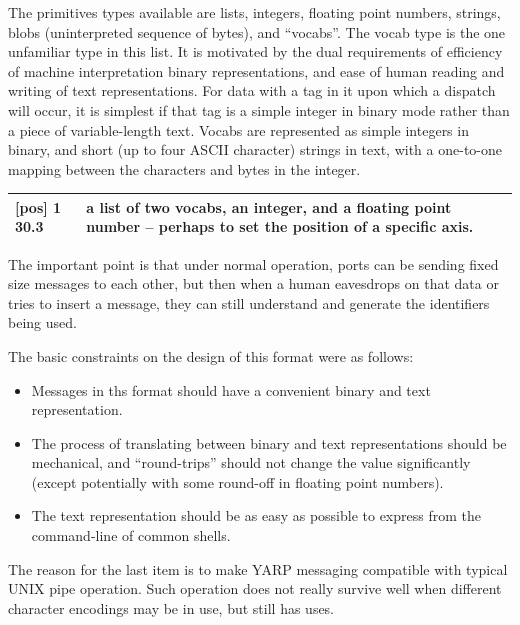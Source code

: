 The primitives types available are lists, integers, floating point
numbers, strings, blobs (uninterpreted sequence of bytes), and
``vocabs''.  The vocab type is the one unfamiliar type in this list.
It is motivated by the dual requirements of efficiency of machine
interpretation binary representations, and ease of human reading and
writing of text representations.  For data with a tag in it upon which
a dispatch will occur, it is simplest if that tag is a simple integer
in binary mode rather than a piece of variable-length text.
Vocabs are represented as simple integers in binary, and short
(up to four ASCII character) strings in text, with a one-to-one
mapping between the characters and bytes in the integer.  


\begin{tabular}{|p{5cm}|p{6cm}|}
\hline
[set] [pos] 1 30.3 & a list of two vocabs, an integer, and a floating
point number -- perhaps to set the position of a specific axis. \\
\hline
\end{tabular}

The important point is that under normal operation, ports can be
sending fixed size messages to each other, but then when a human
eavesdrops on that data or tries to insert a message, they can still
understand and generate the identifiers being used.


The basic constraints on the design of this format were as follows:

\begin{itemize}

\item Messages in ths format should have a convenient binary and text
representation.

\item The process of translating between binary and text
representations should be mechanical, and ``round-trips'' should not
change the value significantly (except potentially with some round-off
in floating point numbers).

\item The text representation should be as easy as possible
to express from the command-line of common shells.

\end{itemize}

The reason for the last item is to make YARP messaging compatible
with typical UNIX pipe operation.  Such operation does not 
really survive well when different character encodings may be
in use, but still has uses.



